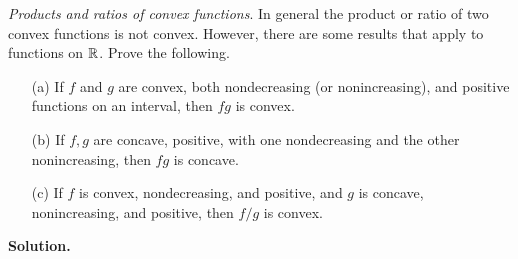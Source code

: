 \documentclass[a4paper, 11pt]{report}
\begin{document}
\textit{Products and ratios of convex functions}. In general the product or ratio of two convex functions is not convex. However, there are some results that apply to functions on $\mathbb{R}$. Prove the following.

\begin{itemize}
    \item[(a)] If $f$ and $g$ are convex, both nondecreasing (or nonincreasing), and positive functions on an interval, then $fg$ is convex.
    
    \item[(b)] If $f, g$ are concave, positive, with one nondecreasing and the other nonincreasing, then $fg$ is concave.

    \item[(c)] If $f$ is convex, nondecreasing, and positive, and $g$ is concave, nonincreasing, and positive, then $f/g$ is convex.
\end{itemize}

\noindent \textbf{Solution.}
\end{document}

